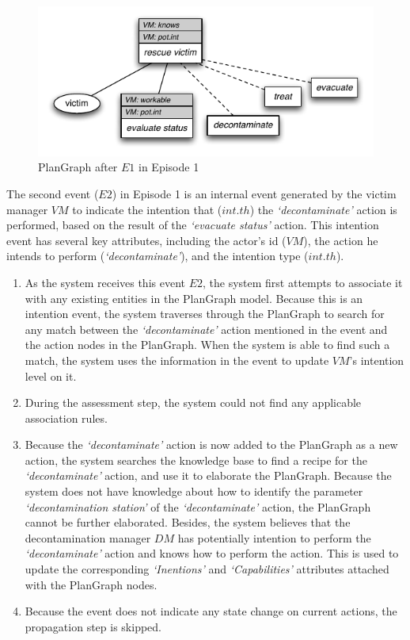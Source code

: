 \begin{figure}[htbp] %
	\centering
	\includegraphics{plangraph_ep1_e1.pdf} 
	\caption{PlanGraph after $E1$ in Episode 1}
	\label{fig:plangraph_ep1_e1}
\end{figure}

The second event ($E2$) in Episode 1 is an internal event generated by the victim manager $VM$ to indicate the intention that ($int.th$) the \emph{`decontaminate'} action is performed, based on the result of the \emph{`evacuate status'} action. This intention event has several key attributes, including the actor’s id ($VM$), the action he intends to perform (\emph{`decontaminate'}), and the intention type ($int.th$).

\begin{enumerate}
	\item As the system receives this event $E2$, the system first attempts to associate it with any existing entities in the PlanGraph model. Because this is an intention event, the system traverses through the PlanGraph to search for any match between the \emph{`decontaminate'} action mentioned in the event and the action nodes in the PlanGraph. When the system is able to find such a match, the system uses the information in the event to update $VM$’s intention level on it.
	\item During the assessment step, the system could not find any applicable association rules.
	\item Because the \emph{`decontaminate'} action is now added to the PlanGraph as a new action, the system searches the knowledge base to find a recipe for the \emph{`decontaminate'} action, and use it to elaborate the PlanGraph. Because the system does not have knowledge about how to identify the parameter \emph{`decontamination station'} of the \emph{`decontaminate'} action, the PlanGraph cannot be further elaborated. Besides, the system believes that the decontamination manager $DM$ has potentially intention to perform the \emph{`decontaminate'} action and knows how to perform the action. This is used to update the corresponding \emph{`Inentions'} and \emph{`Capabilities'} attributes attached with the PlanGraph nodes.
	\item Because the event does not indicate any state change on current actions, the propagation step is skipped.
\end{enumerate}

